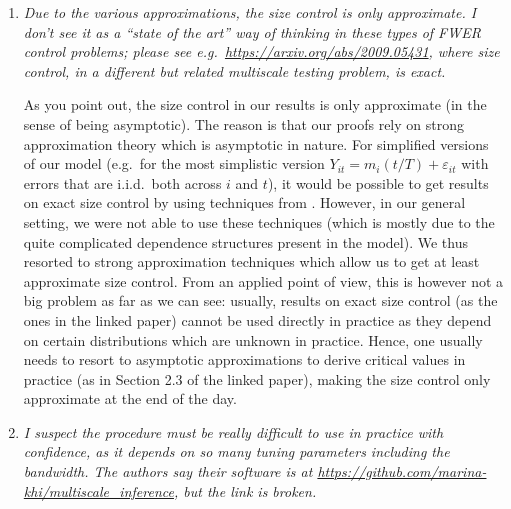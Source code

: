 \documentclass[a4paper,12pt]{article}
\begin{document}
\begin{enumerate}[label=\arabic*.,leftmargin=0.6cm]
\item \textit{Due to the various approximations, the size control is only approximate. I don’t see it as a ``state of the art'' way of thinking in these types of FWER control problems; please see e.g.\ \url{https://arxiv.org/abs/2009.05431},
where size control, in a different but related multiscale testing problem, is exact.}

As you point out, the size control in our results is only approximate (in the sense of being asymptotic). The reason is that our proofs rely on strong approximation theory which is asymptotic in nature. For simplified versions of our model (e.g.\ for the most simplistic version $Y_{it} = m_i(t/T) + \varepsilon_{it}$ with errors that are i.i.d.\ both across $i$ and $t$), it would be possible to get results on exact size control by using techniques from \cite{Chernozhukov2017}. However, in our general setting, we were not able to use these techniques (which is mostly due to the quite complicated dependence structures present in the model). We thus resorted to strong approximation techniques which allow us to get at least approximate size control. From an applied point of view, this is however not a big problem as far as we can see: usually, results on exact size control (as the ones in the linked paper) cannot be used directly in practice as they depend on certain distributions which are unknown in practice. Hence, one usually needs to resort to asymptotic approximations to derive critical values in practice (as in Section 2.3 of the linked paper), making the size control only approximate at the end of the day. %
    

\item \textit{I suspect the procedure must be really difficult to use in practice with confidence, as it depends on so many tuning parameters including the bandwidth. The authors say their software is at \url{https://github.com/marina-khi/multiscale_inference}, but the link is broken.}


\end{enumerate}
\end{document}
